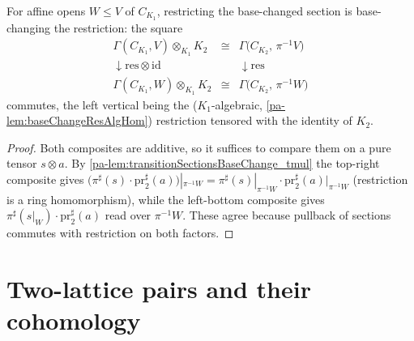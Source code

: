 \begin{lemma}
  \label{pa-lem:transitionSectionsBaseChange_naturality}
  \leanok

  For affine opens \(W \le V\) of \(C_{K_1}\), restricting the base-changed section is
  base-changing the restriction: the square
  \[
    \begin{array}{ccc}
      \Gamma(C_{K_1}, V) \otimes_{K_1} K_2 & \cong &
        \Gamma\bigl(C_{K_2},\, \pi^{-1}V\bigr) \\
      \downarrow \mathrm{res} \otimes \mathrm{id} & & \downarrow \mathrm{res} \\
      \Gamma(C_{K_1}, W) \otimes_{K_1} K_2 & \cong &
        \Gamma\bigl(C_{K_2},\, \pi^{-1}W\bigr)
    \end{array}
  \]
  commutes, the left vertical being the (\(K_1\)-algebraic,
  \ref{pa-lem:baseChangeResAlgHom}) restriction tensored with the identity of \(K_2\).
\end{lemma}
\begin{proof}
  \leanok
  Both composites are additive, so it suffices to compare them on a pure tensor
  \(s \otimes a\). By \ref{pa-lem:transitionSectionsBaseChange_tmul} the top-right composite
  gives \(\bigl(\pi^{\sharp}(s) \cdot \mathrm{pr}_2^{\sharp}(a)\bigr)|_{\pi^{-1}W} =
  \pi^{\sharp}(s)|_{\pi^{-1}W} \cdot \mathrm{pr}_2^{\sharp}(a)|_{\pi^{-1}W}\)
  (restriction is a ring homomorphism), while the left-bottom composite gives
  \(\pi^{\sharp}(s|_W) \cdot \mathrm{pr}_2^{\sharp}(a)\) read over \(\pi^{-1}W\). These
  agree because pullback of sections commutes with restriction on both factors.
\end{proof}

\section{Two-lattice pairs and their cohomology}
\label{pa-sec:two_lattice_pairs}

